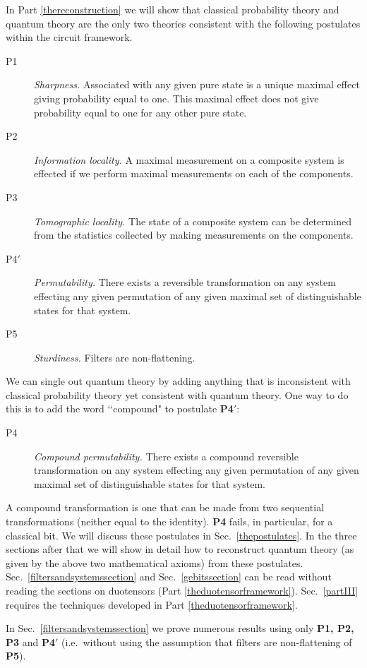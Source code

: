 \documentclass[10pt]{article}
\begin{document}
In Part \ref{thereconstruction} we will show that classical probability theory and quantum theory are the only two theories consistent with the following postulates within the circuit framework.
\begin{description}
\item[P1] \emph{Sharpness.} Associated with any given pure state is a unique maximal effect giving probability equal to one.  This maximal effect does not give probability equal to one for any other pure state.
\item[P2] \emph{Information locality.} A maximal measurement on a composite system is effected if we perform maximal measurements on each of the components.
\item[P3] \emph{Tomographic locality.} The state of a composite system can be determined from the statistics collected by making measurements on the components.
\item[P4$'$] \emph{Permutability.} There exists a reversible transformation on any system effecting any given permutation of any given maximal set of distinguishable states for that system.
\item[P5] \emph{Sturdiness.} Filters are non-flattening.
\end{description}
We can single out quantum theory by adding anything that is inconsistent with classical probability theory yet consistent with quantum theory. One way to do this is to add the word \lq\lq compound" to postulate {\bf P4$'$}:
\begin{description}
\item[P4] \emph{Compound permutability.} There exists a compound reversible transformation on any system effecting any given permutation of any given maximal set of distinguishable states for that system.
\end{description}
A compound transformation is one that can be made from two sequential transformations (neither equal to the identity).  {\bf P4} fails, in particular, for a classical bit.  We will discuss these postulates in Sec.\ \ref{thepostulates}.  In the three sections after that we will show in detail how to reconstruct quantum theory (as given by the above two mathematical axioms) from these postulates.   Sec.\ \ref{filtersandsystemssection} and Sec.\ \ref{gebitssection} can be read without reading the sections on duotensors (Part \ref{theduotensorframework}).  Sec.\ \ref{partIII} requires the techniques developed in Part \ref{theduotensorframework}.

In Sec.\ \ref{filtersandsystemssection} we prove numerous results using only {\bf P1, P2, P3} and {\bf P4}$'$ (i.e.\ without using the assumption that filters are non-flattening of {\bf P5}).
\end{document}
